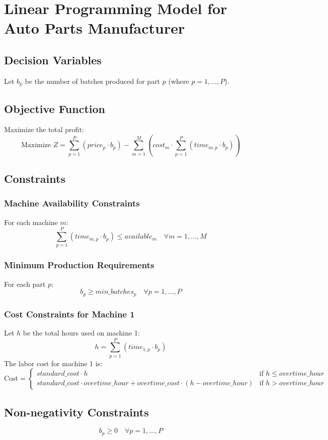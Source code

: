 \documentclass{article}
\begin{document}
\section*{Linear Programming Model for Auto Parts Manufacturer}

\subsection*{Decision Variables}
Let \( b_p \) be the number of batches produced for part \( p \) (where \( p = 1, \ldots, P \)).

\subsection*{Objective Function}
Maximize the total profit:
\[
\text{Maximize } Z = \sum_{p=1}^{P} (price_p \cdot b_p) - \sum_{m=1}^{M} (cost_m \cdot \sum_{p=1}^{P} (time_{m,p} \cdot b_p))
\]

\subsection*{Constraints}

\subsubsection*{Machine Availability Constraints}
For each machine \( m \):
\[
\sum_{p=1}^{P} (time_{m,p} \cdot b_p) \leq available_m \quad \forall m = 1, \ldots, M
\]

\subsubsection*{Minimum Production Requirements}
For each part \( p \):
\[
b_p \geq min\_batches_p \quad \forall p = 1, \ldots, P
\]

\subsubsection*{Cost Constraints for Machine 1}
Let \( h \) be the total hours used on machine 1:
\[
h = \sum_{p=1}^{P} (time_{1,p} \cdot b_p)
\]
The labor cost for machine 1 is:
\[
\text{Cost} = 
\begin{cases} 
standard\_cost \cdot h & \text{if } h \leq overtime\_hour \\
standard\_cost \cdot overtime\_hour + overtime\_cost \cdot (h - overtime\_hour) & \text{if } h > overtime\_hour 
\end{cases}
\]

\subsection*{Non-negativity Constraints}
\[
b_p \geq 0 \quad \forall p = 1, \ldots, P
\]
\end{document}
